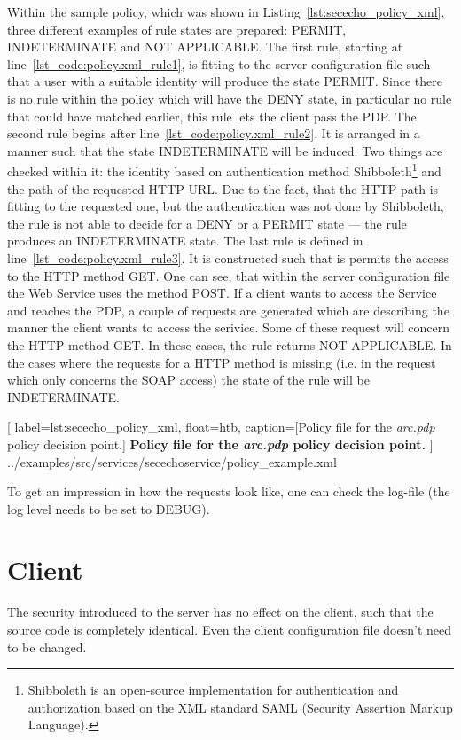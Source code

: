 Within the sample policy, which was shown in Listing~\ref{lst:sececho_policy_xml}, three different examples of rule states are prepared: PERMIT, INDETERMINATE and NOT APPLICABLE.
The first rule, starting at line~\ref{lst_code:policy.xml_rule1}, is fitting to the server configuration file such that a user with a suitable identity will produce the state PERMIT. 
Since there is no rule within the policy which will have the DENY state, in particular no rule that could have matched earlier, this rule lets the client pass the PDP.
The second rule begins after line~\ref{lst_code:policy.xml_rule2}. It is arranged in a manner such that the state INDETERMINATE will be induced. Two things are checked within it: the identity based on authentication method Shibboleth\footnote{Shibboleth is an open-source implementation for authentication and authorization based on the XML standard SAML (Security Assertion Markup Language).} 
and the path of the requested HTTP URL. Due to the fact, that the HTTP path is fitting to the requested one, but the authentication was not done by Shibboleth, the rule is not able to decide for a DENY or a PERMIT state --- the rule produces an INDETERMINATE state.
The last rule is defined in line~\ref{lst_code:policy.xml_rule3}. It is constructed such that is permits the access to the HTTP method GET. 
One can see, that within the server configuration file the Web Service uses the method POST. If a client wants to access the Service and reaches the PDP, a couple of requests are generated which are describing the manner the client wants to access the serivice. Some of these request will concern the HTTP method GET. In these cases, the rule returns NOT APPLICABLE. In the cases where the requests for a HTTP method is missing (i.e. in the request which only concerns the SOAP access) the state of the rule will be INDETERMINATE.\\

	[
	label=lst:sececho_policy_xml, float=htb,
	caption={[Policy file for the \textit{arc.pdp} policy decision point.]
	\textbf{Policy file for the \textit{arc.pdp} policy decision point.}}
	]
{../examples/src/services/secechoservice/policy_example.xml}


To get an impression in how the requests look like, one can check the log-file (the log level needs to be set to DEBUG).


\section{Client}

The security introduced to the server has no effect on the client, such that the source code is completely identical. Even the client configuration file doesn't need to be changed.
















